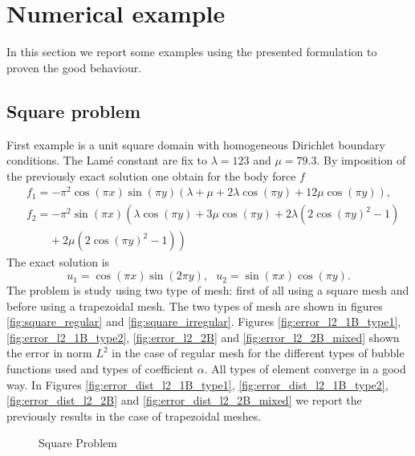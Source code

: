 \documentclass[preprint,12pt,authoryear]{elsarticle}
\begin{document}
\section{Numerical example}
In this section we report some examples using the presented formulation to proven the good behaviour. 

\subsection{Square problem}
First example is a unit square domain with homogeneous Dirichlet boundary conditions.
The Lamé constant are fix to $\lambda = 123$ and $\mu=79.3$.
By imposition of the previously exact solution one obtain for the body force $f$
\begin{equation}
\begin{split}
&f_{1} = -\pi^{2} \cos(\pi x) \sin(\pi y) \left( \lambda + \mu + 2\lambda\cos(\pi y) + 
12\mu\cos(\pi y)\right), \\
&f_{2} = -\pi^{2}\sin(\pi x)\left( \lambda\cos(\pi y) + 3\mu\cos(\pi y) + 2\lambda\left(2\cos(\pi y)^{2} 
- 1\right) \right.\\
&\left. \hspace{24pt} + 2\mu\left(2\cos(\pi y)^{2} - 1\right) \right)
\end{split}
\end{equation}
The exact solution is
\begin{equation} \label{eq:exact_solution}
u_{1} = \cos (\pi x) \sin(2\pi y), \mbox{ } u_{2} = \sin(\pi x)\cos(\pi y). 
\end{equation} 
The problem is study using two type of mesh: first of all using a square mesh and before using a trapezoidal mesh. The two types of mesh are shown in figures \ref{fig:square_regular} and \ref{fig:square_irregular}.
Figures \ref{fig:error_l2_1B_type1}, \ref{fig:error_l2_1B_type2}, \ref{fig:error_l2_2B} and \ref{fig:error_l2_2B_mixed} shown the error in norm $L^{2}$ in the case of regular mesh for the different types of bubble functions used and types of coefficient $\alpha$. All types of element converge in a good way.
In Figures  \ref{fig:error_dist_l2_1B_type1}, \ref{fig:error_dist_l2_1B_type2}, \ref{fig:error_dist_l2_2B} and \ref{fig:error_dist_l2_2B_mixed} we report the previously results in the case of trapezoidal meshes. 
%
\begin{figure}[h!]
\begin{center}
\hspace{5pt}
\caption{Square Problem}
\end{center}
\end{figure}
\end{document}
